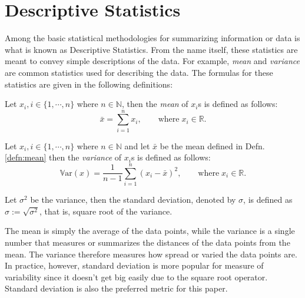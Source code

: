\section{Descriptive Statistics}\label{sec:descriptive_stat_method}
Among the basic statistical methodologies for summarizing information or data is what is known as Descriptive Statistics. From the name itself, these statistics are meant to convey simple descriptions of the data. For example, \textit{mean} and \textit{variance} are common statistics used for describing the data. The formulas for these statistics are given in the following definitions:
\begin{defnx}[Mean]\label{defn:mean}
Let $x_i, i\in\{1,\cdots,n\}$ where $n\in\mathbb{N}$, then the \textit{mean} of $x_i$s is defined as follows:
\begin{equation}
    \bar{x} = \sum_{i=1}^n x_i, \qquad\text{where}\;x_i \in\mathbb{R}.
\end{equation}
\end{defnx}
\begin{defnx}[Variance]
    Let $x_i, i\in\{1,\cdots,n\}$ where $n\in\mathbb{N}$ and let $\bar{x}$ be the mean defined in Defn. \ref{defn:mean} then the \textit{variance} of $x_i$s is defined as follows:
    \begin{equation}
        \mathbb{V}\text{ar}(x) = \frac{1}{n-1}\sum_{i=1}^n (x_i-\bar{x})^2, \qquad\text{where}\;x_i \in\mathbb{R}.
    \end{equation}    
\end{defnx}
\begin{defnx}
Let $\sigma^2$ be the variance, then the standard deviation, denoted by $\sigma$, is defined as $\sigma:=\sqrt{\sigma^2}$, that is, square root of the variance.    
\end{defnx}
The mean is simply the average of the data points, while the variance is a single number that measures or summarizes the distances of the data points from the mean. The variance therefore measures how spread or varied the data points are. In practice, however, standard deviation is more popular for measure of variability since it doesn't get big easily due to the square root operator. Standard deviation is also the preferred metric for this paper.
